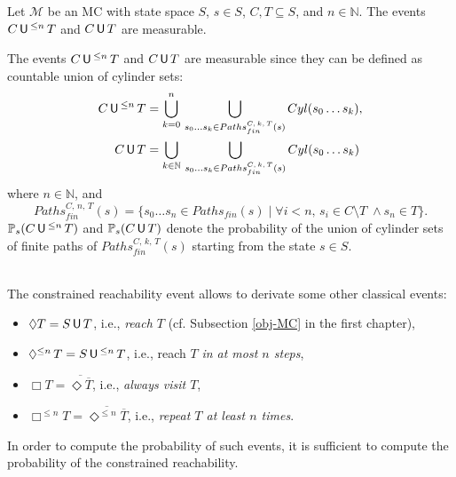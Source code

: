\begin{lemma} \label{cut-lemma}
  Let $\mathcal{M}$ be an MC with state space $S$, $s \in S$, $C, T \subseteq S$, and $n \in \mathbb{N}$.
  The events $C \,\text{\sffamily U}\,^{\leq n} \, T$ and $C\,\text{\sffamily U}\, T$ are measurable.
\end{lemma}

\begin{proof2}
  The events $C \,\text{\sffamily U}\,^{\leq n} \, T$ and $C\,\text{\sffamily U}\, T$ are measurable since they can be defined as countable union of cylinder sets:
  \begin{align*}
    C \,\text{\sffamily U}\,^{\leq n} \, T &= \bigcup_{k=0}^n\,\bigcup_{s_0\dots s_k \in Paths_{fin}^{C,\, k,\, T}(s)} Cyl(s_0\dots s_k),\\
    C \,\text{\sffamily U}\, T &= \bigcup_{k\in \mathbb{N}}\,\bigcup_{s_0\dots s_k \in Paths_{fin}^{C,\, k,\, T}(s)} Cyl(s_0\dots s_k)
  \end{align*}
  where $n \in \mathbb{N}$, and \[Paths_{fin}^{C,\, n,\, T}(s) = \{ s_0 \dots s_n \in Paths_{fin}(s) \; | \; \forall i < n, \, s_i \in C \setminus T \; \wedge s_n \in T\}.\]
  $\mathbb{P}_s(C \,\text{\sffamily U}\,^{\leq n} \, T)$ and $\mathbb{P}_s(C \,\text{\sffamily U}\, T)$ denote the probability of the union of cylinder sets of finite paths  of $Paths_{fin}^{C, \, k, \, T}(s)$ starting from the state $s \in S$.
\end{proof2}
$ $ \\

The constrained reachability event allows to derivate some other classical events:
\begin{itemize}
  \item $\Diamond T = S \,\text{\sffamily U}\, T$, i.e., \textit{reach $T$} (cf. Subsection \ref{obj-MC} in the first chapter),
  \item $\Diamond^{\leq n}\, T = S \,\text{\sffamily U}\,^{\leq n}\, T$, i.e., reach $T$ \textit{in at most $n$ steps},
  \item $\Box T =  \overline{\Diamond \overline{T}}$,
  i.e., \textit{always visit $T$},
  \item $\Box^{\leq n} T =  \overline{\Diamond^{\leq n} \overline{T}}$,
  i.e., \textit{repeat $T$ at least $n$ times}.
\end{itemize}

In order to compute the probability of such events, it is sufficient to compute the probability of the constrained reachability.\\

